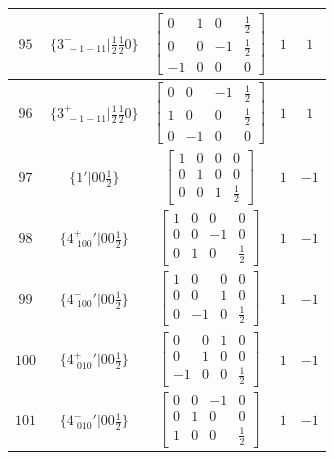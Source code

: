 \documentclass[fleqn,8pt]{jsarticle}
\begin{document}
\begin{longtable}{ccccc}
$ 95 $ & $ \{3^{-}_{\,\,-1-11}|\frac{1}{2} \frac{1}{2} 0\} $ & $ \begin{bmatrix} 0 & 1 & 0 & \frac{1}{2} \\ 0 & 0 & -1 & \frac{1}{2} \\ -1 & 0 & 0 & 0 \end{bmatrix} $ & $ 1 $ & $ 1 $ \\ \hline
$ 96 $ & $ \{3^{+}_{\,\,-1-11}|\frac{1}{2} \frac{1}{2} 0\} $ & $ \begin{bmatrix} 0 & 0 & -1 & \frac{1}{2} \\ 1 & 0 & 0 & \frac{1}{2} \\ 0 & -1 & 0 & 0 \end{bmatrix} $ & $ 1 $ & $ 1 $ \\ \hline
$ 97 $ & $ \{1{}'|0 0 \frac{1}{2}\} $ & $ \begin{bmatrix} 1 & 0 & 0 & 0 \\ 0 & 1 & 0 & 0 \\ 0 & 0 & 1 & \frac{1}{2} \end{bmatrix} $ & $ 1 $ & $ -1 $ \\ \hline
$ 98 $ & $ \{4^{+}_{\,\,100}{}'|0 0 \frac{1}{2}\} $ & $ \begin{bmatrix} 1 & 0 & 0 & 0 \\ 0 & 0 & -1 & 0 \\ 0 & 1 & 0 & \frac{1}{2} \end{bmatrix} $ & $ 1 $ & $ -1 $ \\ \hline
$ 99 $ & $ \{4^{-}_{\,\,100}{}'|0 0 \frac{1}{2}\} $ & $ \begin{bmatrix} 1 & 0 & 0 & 0 \\ 0 & 0 & 1 & 0 \\ 0 & -1 & 0 & \frac{1}{2} \end{bmatrix} $ & $ 1 $ & $ -1 $ \\ \hline
$ 100 $ & $ \{4^{+}_{\,\,010}{}'|0 0 \frac{1}{2}\} $ & $ \begin{bmatrix} 0 & 0 & 1 & 0 \\ 0 & 1 & 0 & 0 \\ -1 & 0 & 0 & \frac{1}{2} \end{bmatrix} $ & $ 1 $ & $ -1 $ \\ \hline
$ 101 $ & $ \{4^{-}_{\,\,010}{}'|0 0 \frac{1}{2}\} $ & $ \begin{bmatrix} 0 & 0 & -1 & 0 \\ 0 & 1 & 0 & 0 \\ 1 & 0 & 0 & \frac{1}{2} \end{bmatrix} $ & $ 1 $ & $ -1 $ \\ \hline

\end{longtable}
\end{document}
